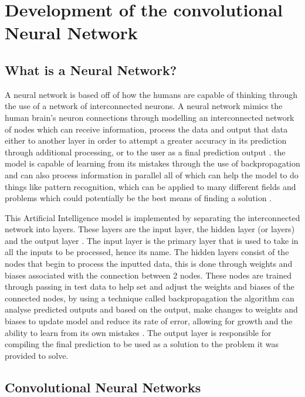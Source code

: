 \documentclass[]{final_report}
\begin{document}
\clearpage
\section{Development of the convolutional Neural Network}
\subsection{What is a Neural Network?}

A neural network is based off of how the humans are capable of thinking through the use of a network of interconnected neurons. A neural network mimics the human brain’s neuron connections through modelling an interconnected network of nodes which can receive information, process the data and output that data either to another layer in order to attempt a greater accuracy in its prediction through additional processing, or to the user as a final prediction output \cite{Dongare2012}. the model is capable of learning from its mistakes through the use of backpropagation and can also process information in parallel all of which can help the model to do things like pattern recognition, which can be applied to many different fields and problems which could potentially be the best means of finding a solution \cite{Woodford2023}. 

This Artificial Intelligence model is implemented by separating the interconnected network into layers. These layers are the input layer, the hidden layer (or layers) and the output layer \cite{IBM2024} . The input layer is the primary layer that is used to take in all the inputs to be processed, hence its name. The hidden layers consist of the nodes that begin to process the inputted data, this is done through weights and biases associated with the connection between 2 nodes. These nodes are trained through passing in test data to help set and adjust the weights and biases of the connected nodes, by using a technique called backpropagation the algorithm can analyse predicted outputs and based on the output, make changes to weights and biases to update model and reduce its rate of error, allowing for growth and the ability to learn from its own mistakes \cite{Schmidhuber2015} . The output layer is responsible for compiling the final prediction to be used as a solution to the problem it was provided to solve. 

\subsection{Convolutional Neural Networks}
\end{document}
